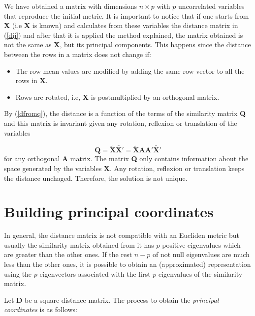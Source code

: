 \documentclass[11pt]{report}
\begin{document}
We have obtained a matrix with dimensions $n \times p$ with $p$ uncorrelated
variables that reproduce the initial metric. It is important to notice that if 
one starts from \textbf{X} (i.e \textbf{X} is known) and calculates from these
variables the distance matrix in (\ref{dij}) and after that it is applied
the method explained, the matrix obtained is not the same as \textbf{X}, but
its principal components. This happens since the distance between the rows in
a matrix does not change if:

\begin{itemize}
\item The row-mean values are modified by adding the same row vector to all
the rows in \textbf{X}.
\item Rows are rotated, i.e, \textbf{X} is postmultiplied by an orthogonal 
matrix.
\end{itemize}

\indent By (\ref{dfromq}), the distance is a function of the terms of the 
similarity matrix \textbf{Q} and this matrix is invariant given any rotation,
reflexion or translation of the variables

\[
\mathbf{Q} = \mathbf{\widetilde{X}} \mathbf{\widetilde{X'}} = \mathbf{\widetilde{X}} \mathbf{A} \mathbf{A'}\mathbf{\widetilde{X'}}
\]
for any orthogonal \textbf{A} matrix. The matrix \textbf{Q} only contains 
information about the space generated by the variables \textbf{X}. Any rotation,
reflexion or translation keeps the distance unchaged. Therefore, the solution
is not unique.


\section{Building principal coordinates}
In general, the distance matrix is not compatible with an Eucliden metric but
usually the similarity matrix obtained from it has $p$ positive eigenvalues  
which are greater than the other ones. If the rest $n-p$ of not null eigenvalues 
are much less than the other ones, it is possible to obtain an (approximated)
representation using the $p$ eigenvectors associated with the first $p$
eigenvalues of the similarity matrix. 

\indent Let \textbf{D} be a square distance matrix. The process to obtain 
the \textit{principal coordinates} is as follows:
\end{document}
